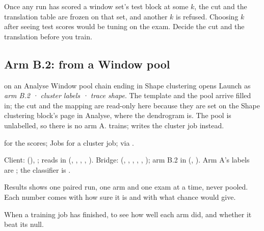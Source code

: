\begin{watchout}
Once any run has scored a window set's test block at some \(k\), the cut and the translation table
are frozen on that set, and another \(k\) is refused. Choosing \(k\) after seeing test scores would
be tuning on the exam. Decide the cut and the translation before you train.
\end{watchout}

\subsection*{Arm B.2: from a Window pool}
 on an Analyse Window pool chain ending in Shape clustering opens Launch as
\emph{arm B.2 · cluster labels · trace shape}. The template and the pool arrive filled in; the cut and
the mapping are read-only here because they are set on the Shape clustering block's page in Analyse,
where the dendrogram is. The pool is unlabelled, so there is no arm A.  trains;
 writes the cluster job instead.

 for the scores; Jobs for a cluster job;  via
.

\begin{underthehood}
Client:  (),
; reads in  (,
, , , ). Bridge:
 (, ,
, , , ); arm B.2 in
 (, ). Arm A's labels
are ; the classifier is .
\end{underthehood}

Results shows one paired run, one arm and one exam at a time, never pooled. Each number comes with
how sure it is and with what chance would give.

When a training job has finished, to see how well each arm did, and whether it beat its null.


